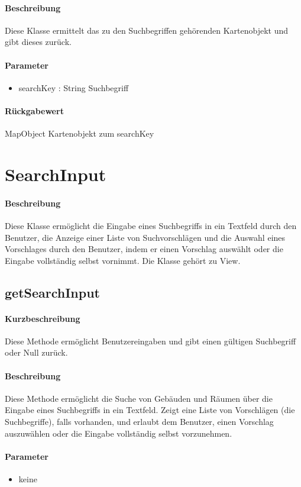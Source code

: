 \paragraph*{Beschreibung}
Diese Klasse ermittelt das zu den Suchbegriffen gehörenden Kartenobjekt und gibt dieses zurück.
\paragraph*{Parameter}
\begin{itemize}
    \item searchKey : String Suchbegriff
\end{itemize}
\paragraph*{Rückgabewert}
MapObject Kartenobjekt zum searchKey


\section{SearchInput}
\paragraph*{Beschreibung}
Diese Klasse ermöglicht die Eingabe eines Suchbegriffs in ein Textfeld durch den Benutzer, 
die Anzeige einer Liste von Suchvorschlägen und die Auswahl eines Vorschlages durch den Benutzer, 
indem er einen Vorschlag auswählt oder die Eingabe vollständig selbst vornimmt.
Die Klasse gehört zu View.

\subsection{getSearchInput}%
\paragraph*{Kurzbeschreibung}
Diese Methode ermöglicht Benutzereingaben und gibt einen gültigen Suchbegriff oder Null zurück.
\paragraph*{Beschreibung}
Diese Methode ermöglicht die Suche von Gebäuden und Räumen über die Eingabe eines Suchbegriffs in ein Textfeld.
Zeigt eine Liste von Vorschlägen (die Suchbegriffe), falls vorhanden, und erlaubt dem Benutzer, einen Vorschlag auszuwählen oder die Eingabe vollständig selbst vorzunehmen.
\paragraph*{Parameter}
\begin{itemize}
    \item keine
\end{itemize}
